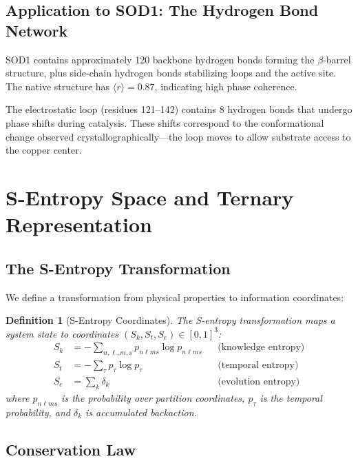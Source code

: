 \documentclass[twocolumn,aps,prx,superscriptaddress,longbibliography]{revtex4-2}
\newtheorem{definition}[theorem]{Definition}
\theoremstyle{remark}
\newcommand{\Sk}{S_k}
\newcommand{\St}{S_t}
\newcommand{\Se}{S_e}
\newcommand{\orderpar}{\langle r \rangle}
\begin{document}
\subsection{Application to SOD1: The Hydrogen Bond Network}

SOD1 contains approximately 120 backbone hydrogen bonds forming the
$\beta$-barrel structure, plus side-chain hydrogen bonds stabilizing
loops and the active site. The native structure has $\orderpar = 0.87$,
indicating high phase coherence.

The electrostatic loop (residues 121--142) contains 8 hydrogen bonds
that undergo phase shifts during catalysis. These shifts correspond to
the conformational change observed crystallographically---the loop moves
to allow substrate access to the copper center.

\section{S-Entropy Space and Ternary Representation}
\label{sec:sentropy}

\subsection{The S-Entropy Transformation}

We define a transformation from physical properties to information
coordinates:

\begin{definition}[S-Entropy Coordinates]
\label{def:sentropy}
The S-entropy transformation maps a system state to coordinates
$(\Sk, \St, \Se) \in [0,1]^3$:
\begin{align}
\Sk &= -\sum_{n,\ell,m,s} p_{n\ell ms} \log p_{n\ell ms} && \text{(knowledge entropy)} \\
\St &= -\sum_{\tau} p_{\tau} \log p_{\tau} && \text{(temporal entropy)} \\
\Se &= \sum_{k} \delta_k && \text{(evolution entropy)}
\end{align}
where $p_{n\ell ms}$ is the probability over partition coordinates,
$p_\tau$ is the temporal probability, and $\delta_k$ is accumulated
backaction.
\end{definition}

\subsection{Conservation Law}
\end{document}

